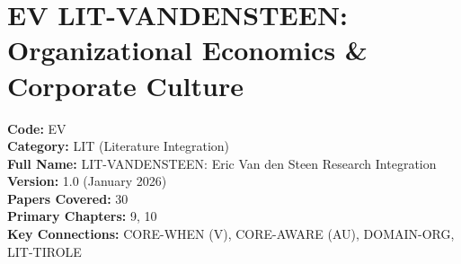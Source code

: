 %
%

\chapter{EV LIT-VANDENSTEEN: Organizational Economics \& Corporate Culture}
\label{app:lit-vandensteen}

\begin{tcolorbox}[colback=blue!5!white, colframe=blue!75!black, title=Appendix Metadata]
\textbf{Code:} EV \\
\textbf{Category:} LIT (Literature Integration) \\
\textbf{Full Name:} LIT-VANDENSTEEN: Eric Van den Steen Research Integration \\
\textbf{Version:} 1.0 (January 2026) \\
\textbf{Papers Covered:} 30 \\
\textbf{Primary Chapters:} 9, 10 \\
\textbf{Key Connections:} CORE-WHEN (V), CORE-AWARE (AU), DOMAIN-ORG, LIT-TIROLE
\end{tcolorbox}

